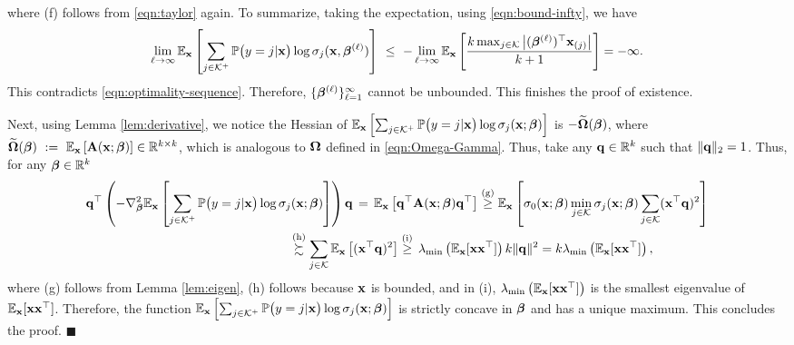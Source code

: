 where (f) follows from \eqref{eqn:taylor} again. 
To summarize, taking the expectation, using \eqref{eqn:bound-infty}, we have 
$$
\lim_{\ell \rightarrow \infty}\mathbb{E}_{\mathbf{x}}\left[\sum_{j\in \mathcal{K}^+} \mathbb{P}\big(y = j| \mathbf{x}\big)\log\sigma_{j}(\mathbf{x}, \bm{\beta}^{(\ell)})\right]~\leq~-\lim_{\ell \rightarrow \infty} 
\mathbb{E}_{\mathbf{x}}\left[\frac{k\max_{j \in \mathcal{K}}\big|(\bm{\beta}^{(\ell)})^{\top}\mathbf{x}_{({j})}\big|}{k+1}\right] = -\infty.
$$
This contradicts \eqref{eqn:optimality-sequence}. Therefore, $\{\bm{\beta}^{(\ell)}\}_{\ell=1}^{\infty}$ cannot be unbounded. This finishes the proof of existence. 

Next, using Lemma \ref{lem:derivative}, we notice the Hessian of $\mathbb{E}_{\mathbf{x}}\left[
    \sum_{j\in \mathcal{K}^+} \mathbb{P}\big(y = j| \mathbf{x}\big)\log\sigma_{j}(\mathbf{x}; \bm{\beta})
    \right]$ is $-\widetilde{\bm{\Omega}}(\bm{\beta})$, where
    $\widetilde{\bm{\Omega}}(\bm{\beta}) ~:=~ \mathbb{E}_{\mathbf{x}}\left[\mathbf{A}(\mathbf{x};\bm{\beta}) \right] \in \mathbb{R}^{k \times k}$, which is analogous to $\bm{\Omega}$ defined in  \eqref{eqn:Omega-Gamma}.
Thus, take any $\mathbf{q} \in \mathbb{R}^{k}$ such that $\lVert \mathbf{q}\rVert_2 = 1$.
Thus, for any $\bm{\beta} \in \mathbb{R}^{k}$
\begin{align*}
   &\mathbf{q}^{\top} \left(-\nabla^2_{\bm{\beta}}\mathbb{E}_{\mathbf{x}}\left[
    \sum_{j\in \mathcal{K}^+} \mathbb{P}\big(y = j| \mathbf{x}\big)\log\sigma_{j}(\mathbf{x}; \bm{\beta})
    \right]\right)\mathbf{q}\,=\,\mathbb{E}_{\mathbf{x}}\left[\mathbf{q}^{\top}
    \mathbf{A}(\mathbf{x}; \bm{\beta})\mathbf{q}^{\top}
    \right]\stackrel{\text{(g)}}{\geq}
\mathbb{E}_{\mathbf{x}}\left[\sigma_{0}(\mathbf{x}; \bm{\beta}) \min_{j\in \mathcal{K}}\sigma_{j}(\mathbf{x}; \bm{\beta})
    \sum_{j\in \mathcal{K}}(\mathbf{x}^{\top}\mathbf{q})^2\right]\\&~~~~~~~~~~~~~~~~~~~~~~~~~~~~~~~~~~~~~~~~~~~~~~~~\stackrel{\text{(h)}}{\succsim}\sum_{j\in \mathcal{K}}\mathbb{E}_{\mathbf{x}}\left[(\mathbf{x}^{\top}\mathbf{q})^2
    \right] \stackrel{\text{(i)}}{\geq}\, \lambda_{\min}\left(\mathbb{E}_{\mathbf{x}}[\mathbf{x} \mathbf{x}^{\top}]\right)k\lVert\mathbf{q}\rVert^2 = k\lambda_{\min}\left(\mathbb{E}_{\mathbf{x}}[\mathbf{x} \mathbf{x}^{\top}]\right),
\end{align*}
where (g) follows from Lemma \ref{lem:eigen}, (h) follows because $\mathbf{x}$ is bounded, and in (i), $\lambda_{\min}\left(\mathbb{E}_{\mathbf{x}}[\mathbf{x} \mathbf{x}^{\top}]\right)$ is the smallest eigenvalue of $\mathbb{E}_{\mathbf{x}}[\mathbf{x} \mathbf{x}^{\top}]$.
Therefore, the function $\mathbb{E}_{\mathbf{x}}\left[
    \sum_{j\in \mathcal{K}^+} \mathbb{P}\big(y = j| \mathbf{x}\big)\log\sigma_{j}(\mathbf{x}; \bm{\beta})
    \right]$ is strictly concave in $\bm{\beta}$ and has a unique maximum. 
    This concludes the proof. 
\hfill $\blacksquare$

\vspace{3mm}

